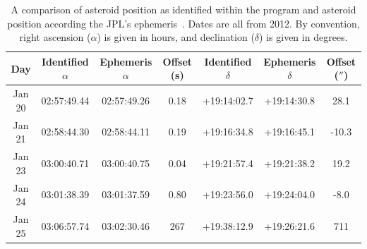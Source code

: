 \documentclass[a4paper,12pt]{article}
\begin{document}
\begin{center}
\begin{table}[!htbp]
  \centering
  \begin{tabular}{c||c||c||c||c||c||c}
  	Day & Identified $\alpha$ & Ephemeris $\alpha$ & Offset (s) & Identified $\delta$ & Ephemeris $\delta$ & Offset ($''$)\\
  	\hline
  	Jan 20 & 02:57:49.44 & 02:57:49.26 & 0.18 & +19:14:02.7 & +19:14:30.8 & 28.1\\
  	\hline
  	Jan 21 & 02:58:44.30 & 02:58:44.11 & 0.19 & +19:16:34.8 & +19:16:45.1 & -10.3\\
  	\hline
  	Jan 23 & 03:00:40.71 & 03:00:40.75 & 0.04 & +19:21:57.4 & +19:21:38.2 & 19.2\\
  	\hline
  	Jan 24 & 03:01:38.39 & 03:01:37.59 & 0.80 & +19:23:56.0 & +19:24:04.0 & -8.0\\
  	\hline
  	Jan 25 & 03:06:57.74 & 03:02:30.46 & 267 & +19:38:12.9 & +19:26:21.6 & 711\\
   \end{tabular}
    \caption{A comparison of asteroid position as identified within the program and asteroid position according the JPL's ephemeris~\citep{urania}. Dates are all from 2012. By convention, right ascension ($\alpha$) is given in hours, and declination ($\delta$) is given in degrees.}
    \label{tab:position}
\end{table}
\end{center}



\end{document}
